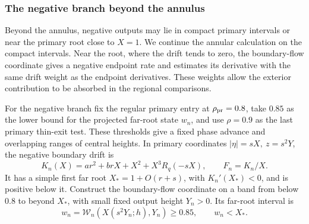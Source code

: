 \subsubsection{The negative branch beyond the annulus}
\label{sec:negative-branch-far-root}

Beyond the annulus, negative outputs may lie in compact primary
intervals or near the primary root close to \(X=1\). We continue the
annular calculation on the compact intervals. Near the root, where the
drift tends to zero, the boundary-flow coordinate gives a negative
endpoint rate and estimates its derivative with the same drift weight
as the endpoint derivatives. These weights allow the exterior
contribution to be absorbed in the regional comparisons.

For the negative branch fix the regular primary entry at
\(\rho_{\rm pr}=0.8\), take \(0.85\) as the lower bound for the projected
far-root state \(w_n\), and use \(\rho=0.9\) as the last primary
thin-exit test. These thresholds give a fixed phase advance and overlapping
ranges of central heights.
In primary coordinates \(|\eta|=sX,\ z=s^2Y\), the negative boundary
drift is
\[
 K_n(X)=ar^2+brX+X^2+X^3R_q(-sX),\qquad F_n=K_n/X .
\]
It has a simple first far root \(X_*=1+O(r+s)\),
with \(K_n'(X_*)<0\), and is positive below it.
Construct the boundary-flow coordinate on a band from
below \(0.8\) to beyond \(X_*\), with small fixed output
height \(Y_n>0\). Its far-root interval is
\begin{equation}
\label{eq:direct-negative-far-core}
 w_n=\mathcal W_n(X(s^2Y_n;h),Y_n)\ge0.85,\qquad w_n<X_* .
\end{equation}

